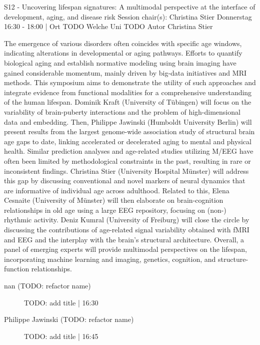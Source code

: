 
            \begin{symposium}
            {S12 - Uncovering lifespan signatures: A multimodal perspective at the interface of development, aging, and disease risk }
            {Session chair(s): Christina Stier}
            {Donnerstag 16:30 - 18:00 | Ort TODO}
            {Welche Uni TODO}
            Autor Christina Stier

The emergence of various disorders often coincides with specific age windows, indicating alterations in developmental or aging pathways. Efforts to quantify biological aging and establish normative modeling using brain imaging have gained considerable momentum, mainly driven by big-data initiatives and MRI methods. This symposium aims to demonstrate the utility of such approaches and integrate evidence from functional modalities for a comprehensive understanding of the human lifespan.
Dominik Kraft (University of Tübingen) will focus on the variability of brain-puberty interactions and the problem of high-dimensional data and embedding. Then, Philippe Jawinski (Humboldt University Berlin) will present results from the largest genome-wide association study of structural brain age gaps to date, linking accelerated or decelerated aging to mental and physical health. Similar prediction analyses and age-related studies utilizing M/EEG have often been limited by methodological constraints in the past, resulting in rare or inconsistent findings. Christina Stier (University Hospital Münster) will address this gap by discussing conventional and novel markers of neural dynamics that are informative of individual age across adulthood. Related to this, Elena Cesnaite (University of Münster) will then elaborate on brain-cognition relationships in old age using a large EEG repository, focusing on (non-) rhythmic activity. Deniz Kumral (University of Freiburg) will close the circle by discussing the contributions of age-related signal variability obtained with fMRI and EEG and the interplay with the brain’s structural architecture.
Overall, a panel of emerging experts will provide multimodal perspectives on the lifespan, incorporating machine learning and imaging, genetics, cognition, and structure-function relationships.
            \begin{description}    
            
                \item [nan (TODO: refactor name)] TODO: add title \textcolor{mygray}{ | 16:30}    
                
                \item [Philippe Jawinski  (TODO: refactor name)] TODO: add title \textcolor{mygray}{ | 16:45}    
                

\end{description}
\end{symposium}
